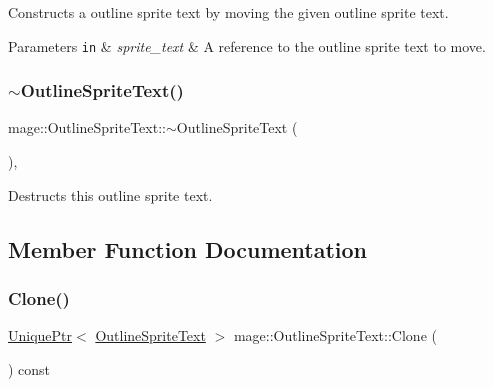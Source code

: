 Constructs a outline sprite text by moving the given outline sprite text.


\begin{DoxyParams}[1]{Parameters}
\mbox{\tt in}  & {\em sprite\+\_\+text} & A reference to the outline sprite text to move. \\
\hline
\end{DoxyParams}
\hypertarget{classmage_1_1_outline_sprite_text_ae4d77ebb3f5bac4fd02b148d6173d10f}{}\label{classmage_1_1_outline_sprite_text_ae4d77ebb3f5bac4fd02b148d6173d10f} 
\subsubsection{\texorpdfstring{$\sim$\+Outline\+Sprite\+Text()}{~OutlineSpriteText()}}
{\footnotesize\ttfamily mage\+::\+Outline\+Sprite\+Text\+::$\sim$\+Outline\+Sprite\+Text (\begin{DoxyParamCaption}{ }\end{DoxyParamCaption})\hspace{0.3cm}{\ttfamily [virtual]}, {\ttfamily [default]}}

Destructs this outline sprite text. 

\subsection{Member Function Documentation}
\hypertarget{classmage_1_1_outline_sprite_text_aa188cb104f6f00fdc75c532d66869f02}{}\label{classmage_1_1_outline_sprite_text_aa188cb104f6f00fdc75c532d66869f02} 
\subsubsection{\texorpdfstring{Clone()}{Clone()}}
{\footnotesize\ttfamily \hyperlink{namespacemage_a8c307fbcc33bce9b7f2aa4c26c3b95cf}{Unique\+Ptr}$<$ \hyperlink{classmage_1_1_outline_sprite_text}{Outline\+Sprite\+Text} $>$ mage\+::\+Outline\+Sprite\+Text\+::\+Clone (\begin{DoxyParamCaption}{ }\end{DoxyParamCaption}) const}

